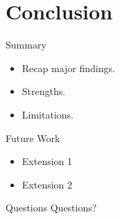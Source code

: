 \section{Conclusion}

\begin{frame}{Summary}
  \begin{itemize}
    \item Recap major findings.
    \item Strengths.
    \item Limitations.
  \end{itemize}
\end{frame}

\begin{frame}{Future Work}
  \begin{itemize}
    \item Extension 1
    \item Extension 2
  \end{itemize}
\end{frame}

\begin{frame}{Questions}
  \centering
  \Huge Questions?
\end{frame}
